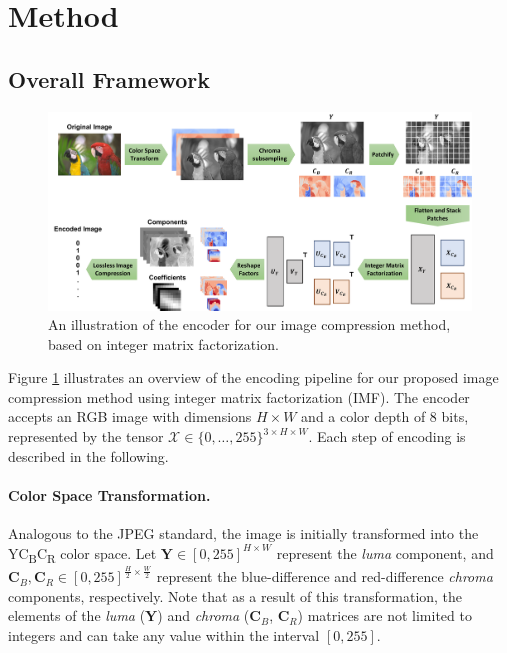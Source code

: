 \section{Method} \label{sec: method}



\subsection{Overall Framework} \label{sec: overall framework}

\begin{figure}[t]
	\centering
	\includegraphics[width=\linewidth]{figures/imf_encoder.pdf}
	\vspace{10pt}
	\caption{An illustration of the encoder for our image compression method, based on integer matrix factorization.}
	\label{fig:imf_encoder}
\end{figure}

Figure \ref{fig:imf_encoder} illustrates an overview of the encoding pipeline for our proposed image compression method using integer matrix factorization (IMF). The encoder accepts an RGB image with dimensions $H \times W$ and a color depth of 8 bits, represented by the tensor $\bm{\mathcal{X}} \in \{0, \ldots, 255\}^{3 \times H \times W}$. Each step of encoding is described in the following.

\paragraph{Color Space Transformation.}
Analogous to the JPEG standard, the image is initially transformed into the YC\textsubscript{B}C\textsubscript{R} color space. Let $\bm{Y} \in [0, 255]^{H \times W}$ represent the \emph{luma} component, and $\bm{C}_B, \bm{C}_R \in [0, 255]^{\frac{H}{2} \times \frac{W}{2}}$ represent the blue-difference and red-difference \emph{chroma} components, respectively. Note that as a result of this transformation, the elements of the \emph{luma} ($\bm{Y}$) and \emph{chroma} ($\bm{C}_B$, $\bm{C}_R$) matrices are not limited to integers and can take any value within the interval $[0, 255]$.

